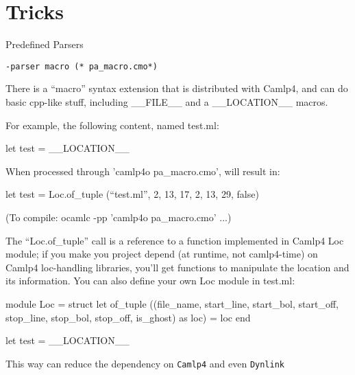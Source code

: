 \section{Tricks}


Predefined Parsers


\verb|-parser macro (* pa_macro.cmo*)| 



There is a ``macro'' syntax extension that is distributed with Camlp4,
and can do basic cpp-like stuff, including __FILE__ and a __LOCATION__
macros.

For example, the following content, named test.ml:
\begin{ocamlcode}
  let test =
    __LOCATION__
\end{ocamlcode}


When processed through 'camlp4o pa_macro.cmo', will result in:


\begin{ocamlcode}
  let test = Loc.of_tuple (``test.ml'', 2, 13, 17, 2, 13, 29, false)
\end{ocamlcode}


(To compile:  ocamlc -pp 'camlp4o pa_macro.cmo' ...)

The ``Loc.of_tuple'' call is a reference to a function implemented in
Camlp4 Loc module; if you make you project depend (at runtime, not
camlp4-time) on Camlp4 loc-handling libraries, you'll get functions to
manipulate the location and its information. You can also define your
own Loc module in test.ml:
\begin{ocamlcode}
  module Loc = struct
    let of_tuple
      ((file_name, start_line, start_bol, start_off, stop_line,
stop_bol, stop_off, is_ghost) as loc) =
        loc
  end

  let test =
    __LOCATION__
\end{ocamlcode}

This way can reduce the dependency on \verb|Camlp4| and even \verb|Dynlink|
